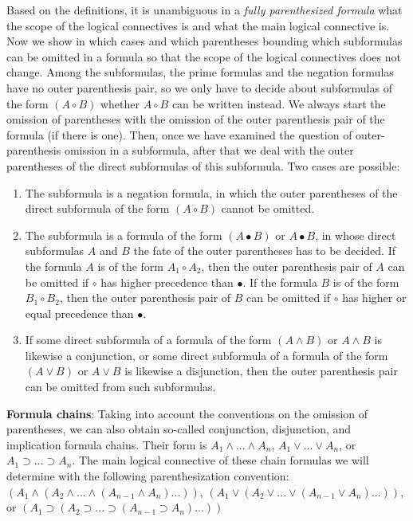 \documentclass[margin=0px]{article}
\begin{document}
Based on the definitions, it is unambiguous in a \textit{fully parenthesized formula} what the scope of the logical connectives is and what the main
logical connective is. Now we show in which cases and which parentheses bounding which subformulas can be omitted in a formula so that the scope of the logical connectives does not change. Among the subformulas, the prime formulas and the negation formulas have no outer parenthesis pair, so we only have to decide about subformulas of the form $(A \circ B)$ whether $A \circ B$ can be written instead. We always start the omission of parentheses with the omission of the outer parenthesis pair of the formula (if there is one). Then, once we have examined the question of outer-parenthesis omission in a subformula, after that we deal with the outer parentheses of the direct subformulas of this subformula. Two cases are possible:

\begin{enumerate}
    \item	The subformula is a negation formula, in which the outer parentheses of the direct subformula of the form $(A \circ B)$ cannot be omitted.

    \item	The subformula is a formula of the form $(A \bullet B)$ or $A \bullet B$, in whose direct subformulas $A$ and $B$ the fate of the outer parentheses has to be decided. If the formula $A$ is of the form $A_{1} \circ A_{2}$, then the outer parenthesis pair of $A$ can be omitted if $\circ$ has higher precedence than $\bullet$. If the formula $B$ is of the form $B_{1} \circ B_{2}$, then the outer parenthesis pair of $B$ can be omitted if $\circ$ has higher or equal precedence than $\bullet$.

    \item	If some direct subformula of a formula of the form $(A \wedge B)$ or $A \wedge B$ is likewise a conjunction, or some direct subformula of a formula of the form
          $(A \vee B)$ or $A \vee B$ is likewise a disjunction, then the outer parenthesis pair can be omitted from such subformulas.
\end{enumerate}

\noindent \textbf{Formula chains}: Taking into account the conventions on the omission of parentheses, we can also obtain so-called conjunction, disjunction, and implication formula chains. Their form is $A_{1} \wedge ... \wedge A_{n}$, $A_{1} \vee ... \vee A_{n}$, or
$A_{1} \supset ... \supset A_{n}$. The main logical connective of these chain formulas we will determine with the following parenthesization convention: $(A_{1} \wedge (A_{2} \wedge ... \wedge (A_{n-1} \wedge A_{n})...))$, $(A_{1} \vee (A_{2} \vee ... \vee (A_{n-1} \vee A_{n})...))$, or $(A_{1} \supset (A_{2} \supset ... \supset (A_{n-1} \supset A_{n})...))$
\end{document}
